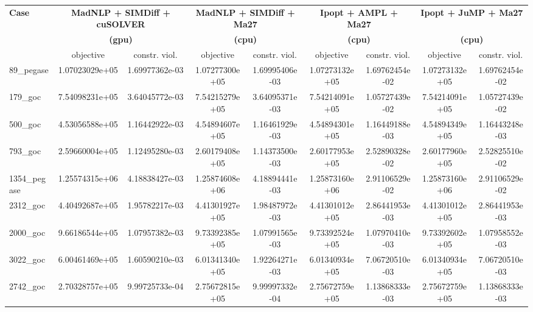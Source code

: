 \begin{tabular}{|l|cc|cc|cc|cc|}
  \hline
  \multirow{3}{*}{\textbf{Case}}
  & \multicolumn{2}{c|}{\textbf{MadNLP + SIMDiff + cuSOLVER}}
  & \multicolumn{2}{c|}{\textbf{MadNLP + SIMDiff + Ma27}}
  & \multicolumn{2}{c|}{\textbf{Ipopt + AMPL + Ma27}}
  & \multicolumn{2}{c|}{\textbf{Ipopt + JuMP + Ma27}}\\
  &\multicolumn{2}{c|}{\textbf{(gpu)}} &\multicolumn{2}{c|}{\textbf{(cpu)}} &\multicolumn{2}{c|}{\textbf{(cpu)}}&\multicolumn{2}{c|}{\textbf{(cpu)}}
  \\
  \cline{2-9}
  & objective & constr. viol.
  & objective & constr. viol.
  & objective & constr. viol.
  & objective & constr. viol.
  \\
  \hline
89\_pegase 
& 1.07023029e+05
& 1.69977362e-03
& 1.07277300e+05
& 1.69995406e-03
& 1.07273132e+05
& 1.69762454e-02
& 1.07273132e+05
& 1.69762454e-02
\\

179\_goc 
& 7.54098231e+05
& 3.64045772e-03
& 7.54215279e+05
& 3.64095371e-03
& 7.54214091e+05
& 1.05727439e-02
& 7.54214091e+05
& 1.05727439e-02
\\

500\_goc 
& 4.53056588e+05
& 1.16442922e-03
& 4.54894607e+05
& 1.16461929e-03
& 4.54894301e+05
& 1.16449188e-03
& 4.54894349e+05
& 1.16443248e-03
\\

793\_goc 
& 2.59660004e+05
& 1.12495280e-03
& 2.60179408e+05
& 1.14373500e-03
& 2.60177953e+05
& 2.52890328e-02
& 2.60177960e+05
& 2.52825510e-02
\\

1354\_pegase 
& 1.25574315e+06
& 4.18838427e-03
& 1.25874608e+06
& 4.18894441e-03
& 1.25873160e+06
& 2.91106529e-02
& 1.25873160e+06
& 2.91106529e-02
\\
\hline
2312\_goc 
& 4.40492687e+05
& 1.95782217e-03
& 4.41301927e+05
& 1.98487972e-03
& 4.41301012e+05
& 2.86441953e-03
& 4.41301012e+05
& 2.86441953e-03
\\

2000\_goc 
& 9.66186544e+05
& 1.07957382e-03
& 9.73392385e+05
& 1.07991565e-03
& 9.73392524e+05
& 1.07970410e-03
& 9.73392602e+05
& 1.07958552e-03
\\

3022\_goc 
& 6.00461469e+05
& 1.60590210e-03
& 6.01341340e+05
& 1.92264271e-03
& 6.01340934e+05
& 7.06720510e-03
& 6.01340934e+05
& 7.06720510e-03
\\

2742\_goc 
& 2.70328757e+05
& 9.99725733e-04
& 2.75672815e+05
& 9.99997332e-04
& 2.75672759e+05
& 1.13868333e-03
& 2.75672759e+05
& 1.13868333e-03
\\


\end{tabular}
